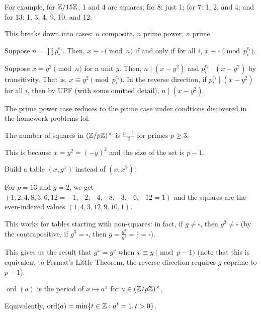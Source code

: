\documentclass[notes]{agony}
\newcommand{\ord}{\operatorname{ord}}
\begin{document}
For example, for $\mathbb{Z}/15\mathbb{Z}$, 1 and 4 are squares;
for 8: just 1; for 7: 1, 2, and 4; and for 13: 1, 3, 4, 9, 10, and 12.

This breaks down into cases: $n$ composite, $n$ prime power, $n$ prime

\begin{theorem}
  Suppose $n = \prod p_i^{e_i}$.
  Then, $x \equiv \square \pmod n$ if and only if for all $i$,
  $x \equiv \square \pmod{p_i^{e_i}}$.
\end{theorem}
\begin{prf}
  Suppose $x = y^2 \pmod n$ for a unit $y$.
  Then, $n \mid (x - y^2)$ and $p_i^{e_i} \mid (x-y^2)$ by transitivity.
  That is, $x \equiv y^2 \pmod {p_i^{e_i}}$.
  In the reverse direction, if $p_i^{e_i} \mid (x - y^2)$ for all $i$,
  then by UPF (with some omitted detail), $n \mid (x-y^2)$.
\end{prf}

The prime power case reduces to the prime case
under condtions discovered in the homework problems lol.

\begin{theorem}
  The number of squares in $(\mathbb{Z}/p\mathbb{Z})^\times$
  is $\frac{p-1}{2}$ for primes $p \geq 3$.
\end{theorem}
\begin{prf}
  This is because $x = y^2 = (-y)^2$ and the size of the set is $p-1$.

  Build a table $(x,g^x)$ instead of $(x,x^2)$:

  For $p=13$ and $g=2$, we get $(1,2,4,8,3,6,12=-1,-2,-4,-8,-3,-6,-12=1)$
  and the squares are the even-indexed values $(1,4,3,12,9,10,1)$.

  This works for tables starting with non-squares:
  in fact, if $g \neq \square$, then $g^3 \neq \square$
  (by the contrapositive, if $g^3 = \square$,
  then $g = \frac{g^3}{g^2} = \frac{\square}{\square} = \square$).

  This gives us the result that $g^x = g^y$ when $x \equiv y \pmod{p-1}$
  (note that this is equivalent to Fermat's Little Theorem,
  the reverse direction requires $g$ coprime to $p-1$).
\end{prf}

\begin{defn}[order]
  $\ord(a)$ is the period of $x \mapsto a^x$ for $a \in (\mathbb{Z}/p\mathbb{Z})^\times$.

  Equivalently, $\ord(a) = \min\{t \in \Z : a^t = 1, t > 0\}$.
\end{defn}
\end{document}
